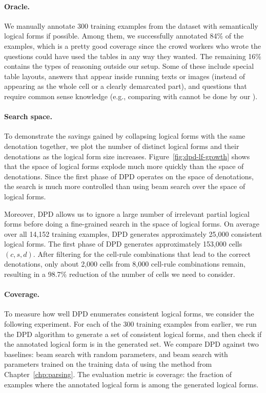 
\paragraph{Oracle.}
We manually annotate 300 training examples
from the \wtq dataset
with semantically logical forms if possible.
Among them, we successfully annotated 84\% of the examples,
which is a pretty good coverage since the crowd workers
who wrote the questions could have used the tables
in any way they wanted.
The remaining 16\% contains the types of reasoning
outside our setup.
Some of these include special table layouts,
answers that appear inside running texts or images
(instead of appearing as the whole cell
or a clearly demarcated part),
and questions that require common sense knowledge
(e.g., comparing  with 
cannot be done by our ).

\paragraph{Search space.}
To demonstrate the savings gained by collapsing logical
forms with the same denotation together,
we plot the
number of distinct logical forms and their denotations
as the logical form size increases.
Figure~\ref{fig:dpd-lf-growth} shows that
the space of logical forms
explode much more quickly than the space of denotations.
Since the first phase of DPD operates
on the space of denotations,
the search is much more controlled than using beam search
over the space of logical forms.

Moreover,
DPD allows us to ignore a large number of irrelevant
partial logical forms before doing a fine-grained search
in the space of logical forms.
On average over all 14,152 training examples,
DPD generates approximately 25,000
consistent logical forms.
The first phase of DPD generates
approximately 153,000 cells $(c, s, d)$.
After filtering for the cell-rule combinations
that lead to the correct denotations,
only about 2,000 cells from 8,000 cell-rule combinations
remain, resulting in a 98.7\% reduction
of the number of cells we need to consider.

\paragraph{Coverage.}
To measure how well DPD enumerates consistent logical forms,
we consider the following experiment.
For each of the 300 training examples from earlier,
we run the DPD algorithm
to generate a set of consistent logical forms,
and then check if the annotated logical form is in the generated set.
We compare DPD against two baselines:
beam search with random parameters,
and beam search with parameters trained on the training data
of \wtq
using the method from Chapter~\ref{chp:parsing}.
The evaluation metric is coverage: the fraction of examples
where the annotated logical form is among the
generated logical forms.

